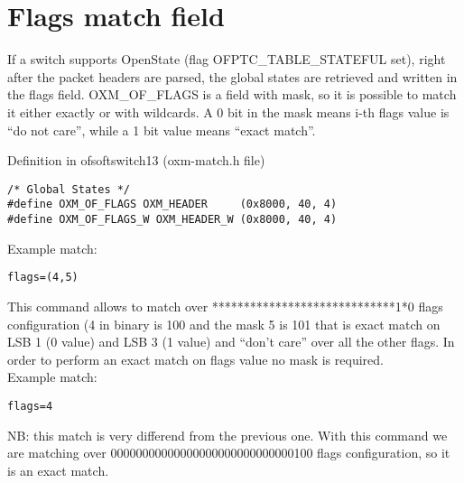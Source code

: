 \section{Flags match field}
\label{section:oxm_of_flags}

If a switch supports OpenState (flag OFPTC\_TABLE\_STATEFUL set), right after the packet headers are parsed, the global states are retrieved and written in the flags field. OXM\_OF\_FLAGS is a field with mask, so it is possible to match it either exactly or with wildcards. A 0 bit in the mask means i-th flags value is ``do not care'', while a 1 bit value means ``exact match''.

Definition in ofsoftswitch13 (oxm-match.h file)
\begin{verbatim}
/* Global States */
#define OXM_OF_FLAGS OXM_HEADER     (0x8000, 40, 4)
#define OXM_OF_FLAGS_W OXM_HEADER_W (0x8000, 40, 4)
\end{verbatim}
Example match:
\begin{verbatim}
flags=(4,5)
\end{verbatim}
This command allows to match over *****************************1*0 flags configuration (4 in binary is 100 and the mask 5 is 101 that is exact match on LSB 1 (0 value) and LSB 3 (1 value) and ``don’t care'' over all the other flags. In order to perform an exact match on flags value no mask is required.
\\Example match:
\begin{verbatim}
flags=4
\end{verbatim}
NB: this match is very differend from the previous one. With this command we are matching over 00000000000000000000000000000100 flags configuration, so it is an exact match.

